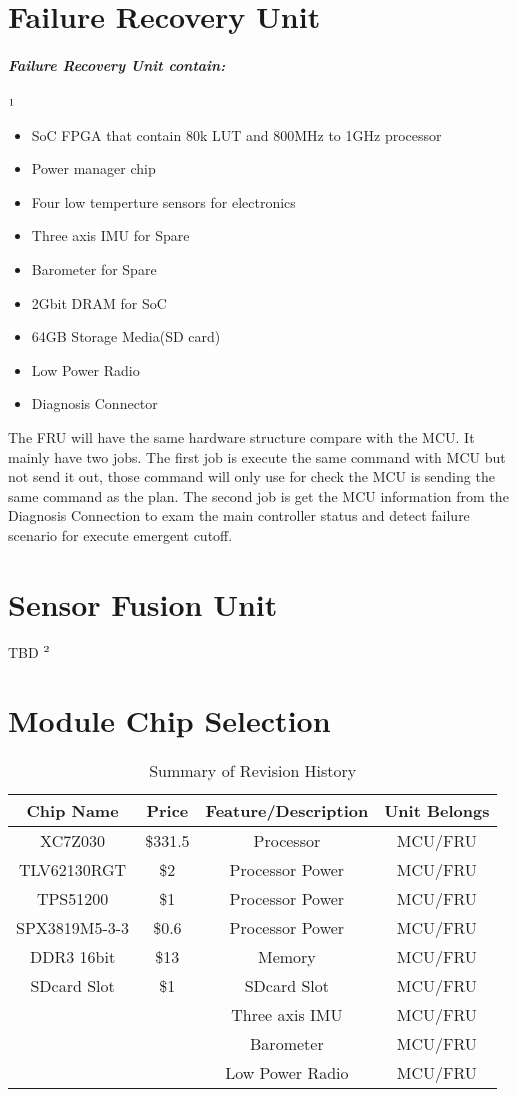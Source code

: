 \documentclass[12pt,article]{memoir}
\begin{document}
\section{Failure Recovery Unit}
\subparagraph{Failure Recovery Unit contain:}$\footnote{The same with the MCU}$
\begin{itemize}
	\item SoC FPGA that contain 80k LUT and 800MHz to 1GHz processor
	\item Power manager chip
	\item Four low temperture sensors for electronics
	\item Three axis IMU for Spare
	\item Barometer for Spare
	\item 2Gbit DRAM for SoC
	\item 64GB Storage Media(SD card)
	\item Low Power Radio
	\item Diagnosis Connector
\end{itemize}
The FRU will have the same hardware structure compare with the MCU. It mainly have two jobs. The first job is execute the same command with MCU but not send it out, those command will only use for check the MCU is sending the same command as the plan. The second job is get the MCU information from the Diagnosis Connection to exam the main controller status and detect failure scenario for execute emergent cutoff.
\section{Sensor Fusion Unit}
TBD $\footnote{This unit will not be avaliable in the first version.}$
\newpage
\section{Module Chip Selection}
\begin{table}[H]
	\centering
	\begin{tabu}{ c | c | c | c }
		Chip Name & Price & Feature/Description & Unit Belongs\\ \hline
		 XC7Z030 & \$331.5 & Processor & MCU/FRU \\
		 TLV62130RGT & \$2 & Processor Power & MCU/FRU \\
		 TPS51200 & \$1 & Processor Power & MCU/FRU \\
		 SPX3819M5-3-3 & \$0.6 & Processor Power & MCU/FRU \\
		 DDR3 16bit& \$13 & Memory & MCU/FRU \\
		 SDcard Slot & \$1 & SDcard Slot & MCU/FRU \\
		 &  & Three axis IMU & MCU/FRU \\
		 &  & Barometer & MCU/FRU \\
		 &  & Low Power Radio & MCU/FRU \\
	\end{tabu}
	\caption{Summary of Revision History}
	\label{tab:slc}
\end{table}
\end{document}
